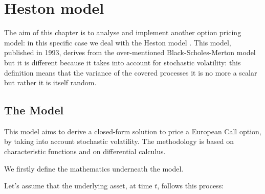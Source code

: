 \documentclass[paper=a4, fontsize=12pt]{scrartcl} %
\numberwithin{equation}{section}
\begin{document}
\section{Heston model}
The aim of this chapter is to analyse and implement another option pricing model: in this specific case we deal with the Heston model \cite{heston93}. This model, published in 1993, derives from the over-mentioned Black-Scholes-Merton model but it is different because it takes into account for stochastic volatility: this definition means that the variance of the covered processes it is no more a scalar but rather it is itself random.	

\subsection{The Model}
This model aims to derive a closed-form solution to price a European Call option, by taking into account stochastic volatility. The methodology is based on characteristic functions and on differential calculus. \par
We firstly define the mathematics underneath the model. \par
Let's assume that the underlying asset, at time $t$, follows this process:
\end{document}
